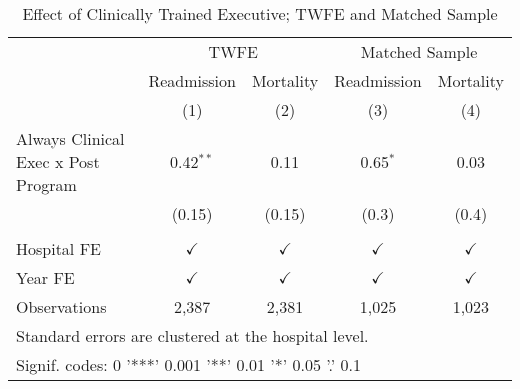 \begin{table}[ht!]

\caption{\label{tab:main_twfe_match}Effect of Clinically Trained Executive; TWFE and Matched Sample}
\centering
\begin{tabular}[t]{lcccc}
\toprule
\multicolumn{1}{c}{\underline{ }} & \multicolumn{2}{c}{TWFE} & \multicolumn{2}{c}{Matched Sample} \\
\cmidrule(l{3pt}r{3pt}){2-3} \cmidrule(l{3pt}r{3pt}){4-5}
\addlinespace[0.3em]
\multicolumn{1}{c}{ } & \multicolumn{1}{c}{Readmission} & \multicolumn{1}{c}{Mortality} & \multicolumn{1}{c}{Readmission} & \multicolumn{1}{c}{Mortality} \\
\cmidrule(l{3pt}r{3pt}){2-2} \cmidrule(l{3pt}r{3pt}){3-3} \cmidrule(l{3pt}r{3pt}){4-4} \cmidrule(l{3pt}r{3pt}){5-5}
 & (1) & (2) & (3) & (4)\\
\midrule
Always Clinical Exec x Post Program & 0.42$^{**}$ & 0.11 & 0.65$^{*}$ & 0.03\\
 & (0.15) & (0.15) & (0.3) & (0.4)\\
 &  &  &  & \\
Hospital FE & $\checkmark$ & $\checkmark$ & $\checkmark$ & $\checkmark$\\
Year FE & $\checkmark$ & $\checkmark$ & $\checkmark$ & $\checkmark$\\
\addlinespace
Observations & 2,387 & 2,381 & 1,025 & 1,023\\
\bottomrule
\multicolumn{5}{l}{\textsuperscript{} Standard errors are clustered at the hospital level.}\\
\multicolumn{5}{l}{\textsuperscript{} Signif. codes: 0 '***' 0.001 '**' 0.01 '*' 0.05 '.' 0.1}\\
\end{tabular}
\end{table}
